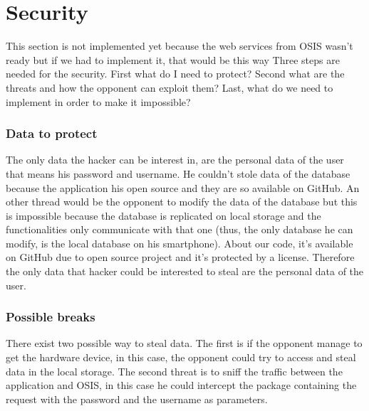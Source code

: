 \documentclass{eplmastersthesis}
\begin{document}
\section{Security}

This section is not implemented yet because the web services from OSIS wasn't ready but if we had to implement it, that would be this way
Three steps are needed for the security. First what do I need to protect? Second what are the threats and how the opponent can exploit them? Last, what do we need to implement in order to make it impossible? 

\subsubsection{Data to protect}
The only data the hacker can be interest in, are the personal data of the user that means his password and username. He couldn't stole data of the database because the application his open source and they are so available on GitHub. An other thread would be the opponent to modify the data of the database but this is impossible because the database is replicated on local storage and the functionalities only communicate with that one (thus, the only database he can modify, is the local database on his smartphone). About our code, it's available on GitHub due to open source project and it's protected by a license. Therefore the only data that hacker could be interested to steal are the personal data of the user.

\subsubsection{Possible breaks}
There exist two possible way to steal data. The first is if the opponent manage to get the hardware device, in this case, the opponent could try to access and steal data in the local storage. The second threat is to sniff the traffic between the application and OSIS, in this case he could intercept the package containing the request with the password and the username as parameters. 
\end{document}
